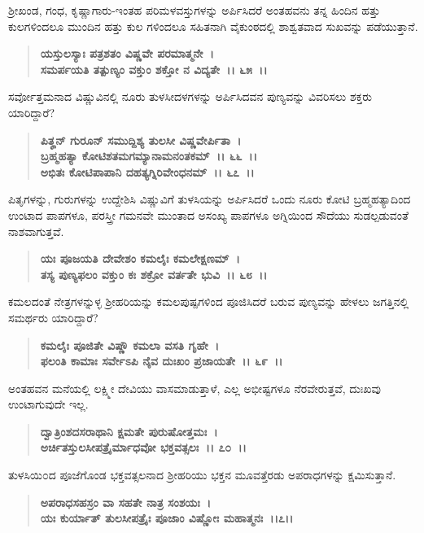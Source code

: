 ಶ‍್ರೀಖಂಡ, ಗಂಧ, ಕೃಷ್ಣಾಗಾರು-ಇಂತಹ ಪರಿಮಳವಸ್ತುಗಳನ್ನು ಅರ್ಪಿಸಿದರೆ ಅಂತಹವನು ತನ್ನ ಹಿಂದಿನ ಹತ್ತು ಕುಲಗಳಿಂದಲೂ ಮುಂದಿನ ಹತ್ತು ಕುಲ ಗಳಿಂದಲೂ ಸಹಿತನಾಗಿ ವೈಕುಂಠದಲ್ಲಿ ಶಾಶ್ವತವಾದ ಸುಖವನ್ನು ಪಡೆಯುತ್ತಾನೆ.

\begin{verse}
\textbf{ಯಸ್ತುಲಸ್ಯಾಃ ಪತ್ರಶತಂ ವಿಷ್ಣವೇ ಪರಮಾತ್ಮನೇ~।}\\\textbf{ಸಮರ್ಪಯತಿ ತತ್ಪುಣ್ಯಂ ವಕ್ತುಂ ಶಕ್ತೋ ನ ವಿದ್ಯತೇ~।। ೬೫~।।}
\end{verse}

ಸರ್ವೋತ್ತಮನಾದ ವಿಷ್ಣುವಿನಲ್ಲಿ ನೂರು ತುಳಸೀದಳಗಳನ್ನು ಅರ್ಪಿಸಿದವನ ಪುಣ್ಯವನ್ನು ವಿವರಿಸಲು ಶಕ್ತರು ಯಾರಿದ್ದಾರೆ?

\begin{verse}
\textbf{ಪಿತೄನ್ ಗುರೂನ್ ಸಮುದ್ದಿಶ್ಯ ತುಲಸೀ ವಿಷ್ಣವೇರ್ಪಿತಾ~।}\\\textbf{ಬ್ರಹ್ಮಹತ್ಯಾ ಕೋಟಿಶತಮಗಮ್ಯಾನಾಮನಂತಕಮ್~।। ೬೬~।।}\\\textbf{ಅಭಿತಃ ಕೋಟಿಪಾಪಾನಿ ದಹತ್ಯಗ್ನಿರಿವೇಂಧನಮ್~।। ೬೭~।।}
\end{verse}

ಪಿತೃಗಳನ್ನು, ಗುರುಗಳನ್ನು ಉದ್ದೇಶಿಸಿ ವಿಷ್ಣುವಿಗೆ ತುಳಸಿಯನ್ನು ಅರ್ಪಿಸಿದರೆ ಒಂದು ನೂರು ಕೋಟಿ ಬ್ರಹ್ಮಹತ್ಯಾದಿಂದ ಉಂಟಾದ ಪಾಪಗಳೂ, ಪರಸ್ತ್ರೀ ಗಮನವೇ ಮುಂತಾದ ಅಸಂಖ್ಯ ಪಾಪಗಳೂ ಅಗ್ನಿಯಿಂದ ಸೌದೆಯು ಸುಡಲ್ಪಡುವಂತೆ ನಾಶವಾಗುತ್ತವೆ.

\begin{verse}
\textbf{ಯಃ ಪೂಜಯತಿ ದೇವೇಶಂ ಕಮಲೈಃ ಕಮಲೇಕ್ಷಣಮ್~।}\\\textbf{ತಸ್ಯ ಪುಣ್ಯಫಲಂ ವಕ್ತುಂ ಕಃ ಶಕ್ರೋ ವರ್ತತೇ ಭುವಿ~।। ೬೮~।।}
\end{verse}

ಕಮಲದಂತೆ ನೇತ್ರಗಳನ್ನುಳ್ಳ ಶ‍್ರೀಹರಿಯನ್ನು ಕಮಲಪುಷ್ಪಗಳಿಂದ ಪೂಜಿಸಿದರೆ ಬರುವ ಪುಣ್ಯವನ್ನು ಹೇಳಲು ಜಗತ್ತಿನಲ್ಲಿ ಸಮರ್ಥರು ಯಾರಿದ್ದಾರೆ?

\begin{verse}
\textbf{ಕಮಲೈಃ ಪೂಜಿತೇ ವಿಷ್ಣೌ ಕಮಲಾ ವಸತಿ ಗೃಹೇ~।}\\\textbf{ಫಲಂತಿ ಕಾಮಾಃ ಸರ್ವೇಽಪಿ ನೈವ ದುಃಖಂ ಪ್ರಜಾಯತೇ~।। ೬೯~।।}
\end{verse}

ಅಂತಹವನ ಮನೆಯಲ್ಲಿ ಲಕ್ಷ್ಮೀ ದೇವಿಯು ವಾಸಮಾಡುತ್ತಾಳೆ, ಎಲ್ಲ ಅಭೀಷ್ಟಗಳೂ ನೆರವೇರುತ್ತವೆ, ದುಃಖವು ಉಂಟಾಗುವುದೇ ಇಲ್ಲ.

\begin{verse}
\textbf{ದ್ವಾತ್ರಿಂಶದಸರಾಥಾನಿ ಕ್ಷಮತೇ ಪುರುಷೋತ್ತಮಃ~।}\\\textbf{ಅರ್ಚಿತಸ್ತುಲಸೀಪತ್ರೈರ್ಮಾಧವೋ ಭಕ್ತವತ್ಸಲಃ~।। ೭೦~।।}
\end{verse}

ತುಳಸಿಯಿ೦ದ ಪೂಜೆಗೊಂಡ ಭಕ್ತವತ್ಸಲನಾದ ಶ‍್ರೀಹರಿಯು ಭಕ್ತನ ಮೂವತ್ತೆರಡು ಅಪರಾಧಗಳನ್ನು ಕ್ಷಮಿಸುತ್ತಾನೆ.

\begin{verse}
\textbf{ಅಪರಾಧಸಹಸ್ರಂ ವಾ ಸಹತೇ ನಾತ್ರ ಸಂಶಯಃ~।}\\\textbf{ಯಃ ಕುರ್ಯಾತ್ ತುಲಸೀಪತ್ರೈಃ ಪೂಜಾಂ ವಿಷ್ಣೋಃ ಮಹಾತ್ಮನಃ~।।೭।।}
\end{verse}


